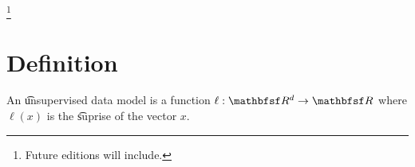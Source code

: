 
\footnote{Future editions will include.}

\section{Definition}

An \t{unsupervised data model} is a function $\ell: \R^d \to \R$ where $\ell(x)$ is the \t{suprise} of the vector $x$.


\blankpage

